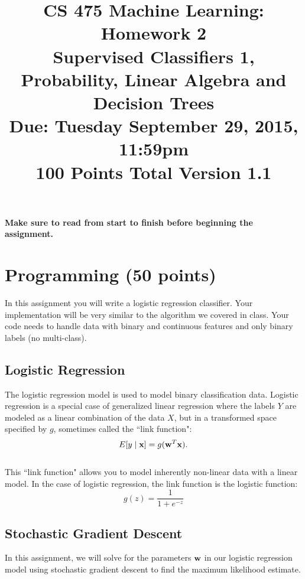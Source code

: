 \documentclass[11pt]{article}
\title{CS 475 Machine Learning: Homework 2\\Supervised Classifiers 1,\\
Probability, Linear Algebra and Decision Trees\\
\Large{Due: Tuesday September 29, 2015, 11:59pm}\\
100 Points Total \hspace{1cm} Version 1.1}
\author{}
\date{}
\newcommand{\vw}{{\bf w}}
\newcommand{\vx}{{\bf x}}
\begin{document}
\large
\maketitle
\thispagestyle{headings}

\vspace{-.5in}

{\bf Make sure to read from start to finish before beginning the assignment.}
\section{Programming (50 points)}
In this assignment you will write a logistic regression classifier. Your implementation will be very similar to
the algorithm we covered in class. Your code needs to handle data with binary and continuous features and only binary labels (no multi-class).

\subsection{Logistic Regression}
The logistic regression model is used to model binary classification data. Logistic regression is a special case of generalized linear regression where the labels $Y$ are modeled as a linear combination of the data $X$, but in a transformed space specified by $g$, sometimes called the ``link function":
\begin{equation}
E[y \mid \vx] = g(\vw^T\vx).
\end{equation}
\\
This ``link function" allows you to model inherently non-linear data with a linear model. In the case of logistic regression, the link function is the logistic function:
\begin{equation}
g(z) = \frac{1}{1 + e^{-z}}
\end{equation}

\subsection{Stochastic Gradient Descent}
In this assignment, we will solve for the parameters $\vw$ in our logistic regression model using stochastic gradient descent to find the maximum likelihood estimate.
\end{document}
